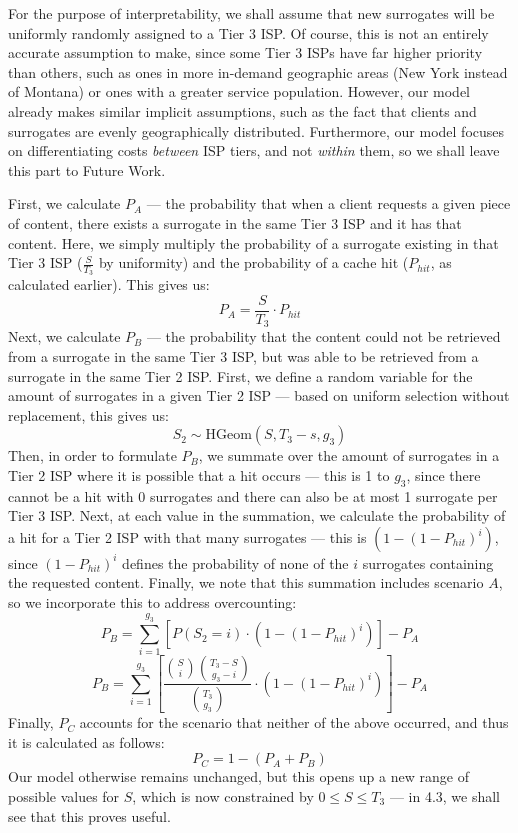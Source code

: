 \documentclass[
	a4paper, %
	10pt, %
	unnumberedsections, %
	twoside, %
]{LTJournalArticle}
\begin{document}
For the purpose of interpretability, we shall assume that new surrogates will be uniformly randomly assigned to a Tier 3 ISP. Of course, this is not an entirely accurate assumption to make, since some Tier 3 ISPs have far higher priority than others, such as ones in more in-demand geographic areas (New York instead of Montana) or ones with a greater service population. However, our model already makes similar implicit assumptions, such as the fact that clients and surrogates are evenly geographically distributed. Furthermore, our model focuses on differentiating costs \textit{between} ISP tiers, and not \textit{within} them, so we shall leave this part to Future Work.

First, we calculate $P_A$ --- the probability that when a client requests a given piece of content, there exists a surrogate in the same Tier 3 ISP and it has that content. Here, we simply multiply the probability of a surrogate existing in that Tier 3 ISP ($\frac{S}{T_3}$ by uniformity) and the probability of a cache hit ($P_{hit}$, as calculated earlier). This gives us:
\[P_A = \frac{S}{T_3} \cdot P_{hit}\]
Next, we calculate $P_B$ --- the probability that the content could not be retrieved from a surrogate in the same Tier 3 ISP, but was able to be retrieved from a surrogate in the same Tier 2 ISP. First, we define a random variable for the amount of surrogates in a given Tier 2 ISP --- based on uniform selection without replacement, this gives us:
\[S_2 \sim \textrm{HGeom}(S, T_3-s, g_3)\]
Then, in order to formulate $P_B$, we summate over the amount of surrogates in a Tier 2 ISP where it is possible that a hit occurs --- this is 1 to $g_3$, since there cannot be a hit with 0 surrogates and there can also be at most 1 surrogate per Tier 3 ISP. Next, at each value in the summation, we calculate the probability of a hit for a Tier 2 ISP with that many surrogates --- this is $(1 - (1 - P_{hit})^i)$, since $(1 - P_{hit})^i$ defines the probability of none of the $i$ surrogates containing the requested content. Finally, we note that this summation includes scenario $A$, so we incorporate this to address overcounting:
\[P_B = \sum^{g_3}_{i=1}[P(S_2 = i) \cdot (1 - (1 - P_{hit})^i)] - P_A\]
\[P_B = \sum^{g_3}_{i=1}\left[\frac{\binom{S}{i}\binom{T_3-S}{g_3 - i}}{\binom{T_3}{g_3}} \cdot (1 - (1 - P_{hit})^i)\right] - P_A\]
Finally, $P_C$ accounts for the scenario that neither of the above occurred, and thus it is calculated as follows:
\[ P_C = 1 - (P_A + P_B)\]
Our model otherwise remains unchanged, but this opens up a new range of possible values for $S$, which is now constrained by $0 \leq S \leq T_3$ --- in 4.3, we shall see that this proves useful.
\end{document}
